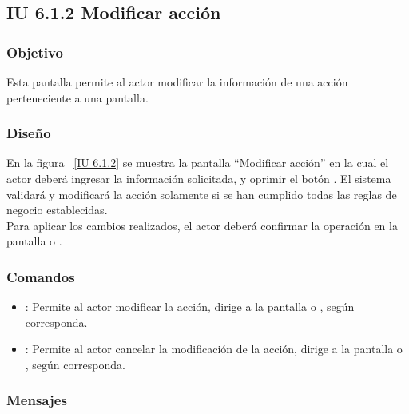 \newpage 
\subsection{IU 6.1.2 Modificar acción}

\subsubsection{Objetivo}
	
	Esta pantalla permite al actor modificar la información de una acción perteneciente a una pantalla.

\subsubsection{Diseño}

    En la figura ~\ref{IU 6.1.2} se muestra la pantalla ``Modificar acción'' en la cual el actor deberá ingresar la información solicitada, y oprimir el botón . El sistema validará y modificará la acción solamente si se han cumplido todas las reglas de negocio establecidas.  \\
	
	Para aplicar los cambios realizados, el actor deberá confirmar la operación en la pantalla  o .
    

\subsubsection{Comandos}
\begin{itemize}
	\item {}: Permite al actor modificar la acción, dirige a la pantalla  o , según corresponda.
	\item {}: Permite al actor cancelar la modificación de la acción, dirige a la pantalla  o , según corresponda.
\end{itemize}

\subsubsection{Mensajes}

